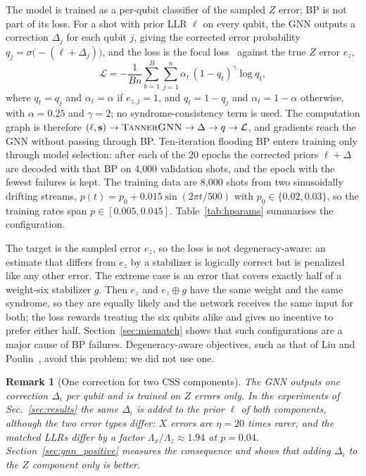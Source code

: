 \documentclass[a4paper,twocolumn,11pt,nopdfoutputerror]{quantumarticle}
\newcommand{\synd}{\mathbf{s}}
\newcommand{\llr}{\Lambda}
\newtheorem{remark}{Remark}
\begin{document}
The model is trained as a per-qubit classifier of the sampled $Z$ error;
BP is not part of its loss. For a shot with prior LLR $\ell$ on every
qubit, the GNN outputs a correction $\Delta_j$ for each qubit $j$, giving
the corrected error probability $q_j=\sigma\bigl(-(\ell+\Delta_j)\bigr)$,
and the loss is the focal loss~\cite{Lin2017Focal} against the true $Z$
error $e_z$,
\begin{equation}
\mathcal{L}=-\frac{1}{Bn}\sum_{b=1}^{B}\sum_{j=1}^{n}
\alpha_{t}\,(1-q_{t})^{\gamma}\log q_{t},
\label{eq:loss}
\end{equation}
where $q_t=q_j$ and $\alpha_t=\alpha$ if $e_{z,j}=1$, and $q_t=1-q_j$
and $\alpha_t=1-\alpha$ otherwise, with $\alpha=0.25$ and $\gamma=2$; no
syndrome-consistency term is used. The computation graph is therefore
$(\ell,\synd)\to\textsc{TannerGNN}\to\Delta\to q\to\mathcal{L}$, and
gradients reach the GNN without passing through BP. Ten-iteration flooding
BP enters training only through model selection: after each of the 20
epochs the corrected priors $\ell+\Delta$ are decoded with that BP on
4{,}000 validation shots, and the epoch with the fewest failures is kept.
The training data are 8{,}000 shots from two sinusoidally drifting
streams, $p(t)=p_0+0.015\sin(2\pi t/500)$ with $p_0\in\{0.02,0.03\}$, so
the training rates span $p\in[0.005,0.045]$. Table~\ref{tab:hparams}
summarises the configuration.

The target is the sampled error $e_z$, so the loss is not
degeneracy-aware: an estimate that differs from $e_z$ by a stabilizer is
logically correct but is penalized like any other error. The extreme case
is an error that covers exactly half of a weight-six stabilizer $g$. Then
$e_z$ and $e_z\oplus g$ have the same weight and the same syndrome, so
they are equally likely and the network receives the same input for
both; the loss rewards treating the six qubits alike and gives no
incentive to prefer either half. Section~\ref{sec:mismatch} shows that
such configurations are a major cause of BP failures. Degeneracy-aware
objectives, such as that of Liu and Poulin~\cite{Liu2019Neural}, avoid
this problem; we did not use one.

\begin{remark}[One correction for two CSS components]
The GNN outputs one correction $\Delta_i$ per qubit and is trained on $Z$
errors only. In the experiments of
Sec.~\ref{sec:results} the same $\Delta_i$ is added to the prior $\ell$ of
both components, although the two error types differ: $X$ errors are
$\eta=20$ times rarer, and the matched LLRs differ by a factor
$\llr_x/\llr_z\approx1.94$ at $p=0.04$. Section~\ref{sec:gnn_positive}
measures the consequence and shows that adding $\Delta_i$ to the $Z$
component only is better.
\end{remark}
\end{document}

